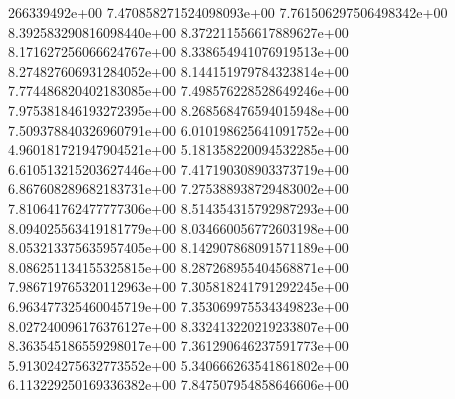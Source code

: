 266339492e+00	7.470858271524098093e+00	7.761506297506498342e+00	8.392583290816098440e+00	8.372211556617889627e+00	8.171627256066624767e+00	8.338654941076919513e+00	8.274827606931284052e+00	8.144151979784323814e+00	7.774486820402183085e+00	7.498576228528649246e+00	7.975381846193272395e+00	8.268568476594015948e+00	7.509378840326960791e+00	6.010198625641091752e+00	4.960181721947904521e+00	5.181358220094532285e+00	6.610513215203627446e+00	7.417190308903373719e+00	6.867608289682183731e+00	7.275388938729483002e+00	7.810641762477777306e+00	8.514354315792987293e+00	8.094025563419181779e+00	8.034660056772603198e+00	8.053213375635957405e+00	8.142907868091571189e+00	8.086251134155325815e+00	8.287268955404568871e+00	7.986719765320112963e+00	7.305818241791292245e+00	6.963477325460045719e+00	7.353069975534349823e+00	8.027240096176376127e+00	8.332413220219233807e+00	8.363545186559298017e+00	7.361290646237591773e+00	5.913024275632773552e+00	5.340666263541861802e+00	6.113229250169336382e+00	7.847507954858646606e+00
